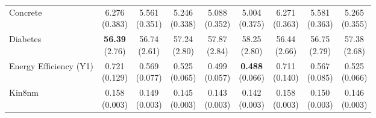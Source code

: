 {\begin{longtable}{lcccccccc}
Concrete & \makecell{6.276\\{\tiny (0.383)}} & \makecell{5.561\\{\tiny (0.351)}} & \makecell{5.246\\{\tiny (0.338)}} & \makecell{5.088\\{\tiny (0.352)}} & \makecell{5.004\\{\tiny (0.375)}} & \makecell{6.271\\{\tiny (0.363)}} & \makecell{5.581\\{\tiny (0.363)}} & \makecell{5.265\\{\tiny (0.355)}} \\
Diabetes & \makecell{\textbf{56.39}\\{\tiny (2.76)}} & \makecell{56.74\\{\tiny (2.61)}} & \makecell{57.24\\{\tiny (2.80)}} & \makecell{57.87\\{\tiny (2.84)}} & \makecell{58.25\\{\tiny (2.80)}} & \makecell{56.44\\{\tiny (2.66)}} & \makecell{56.75\\{\tiny (2.79)}} & \makecell{57.38\\{\tiny (2.68)}} \\
Energy Efficiency (Y1) & \makecell{0.721\\{\tiny (0.129)}} & \makecell{0.569\\{\tiny (0.077)}} & \makecell{0.525\\{\tiny (0.065)}} & \makecell{0.499\\{\tiny (0.057)}} & \makecell{\textbf{0.488}\\{\tiny (0.066)}} & \makecell{0.711\\{\tiny (0.140)}} & \makecell{0.567\\{\tiny (0.085)}} & \makecell{0.525\\{\tiny (0.066)}} \\
Kin8nm & \makecell{0.158\\{\tiny (0.003)}} & \makecell{0.149\\{\tiny (0.003)}} & \makecell{0.145\\{\tiny (0.003)}} & \makecell{0.143\\{\tiny (0.003)}} & \makecell{0.142\\{\tiny (0.003)}} & \makecell{0.158\\{\tiny (0.003)}} & \makecell{0.150\\{\tiny (0.003)}} & \makecell{0.146\\{\tiny (0.003)}} \\

\end{longtable}}
